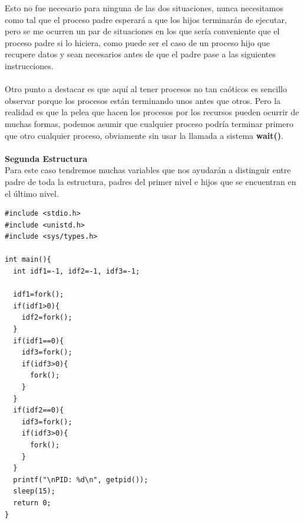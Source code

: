 \documentclass[11pt]{article}
\begin{document}
Esto no fue necesario para ninguna de las dos situaciones, nunca necesitamos como tal que el proceso padre esperará a que los hijos terminarán de ejecutar, pero se me ocurren un par de situaciones en los que sería conveniente que el proceso padre si lo hiciera, como puede ser el caso de un proceso hijo que recupere datos y sean necesarios antes de que el padre pase a las siguientes instrucciones.
\\\\
Otro punto a destacar es que aquí al tener procesos no tan caóticos es sencillo observar porque los procesos están terminando unos antes que otros. Pero la realidad es que la pelea que hacen los procesos por los recursos pueden ocurrir de muchas formas, podemos asumir que cualquier proceso podría terminar primero que otro cualquier proceso, obviamente sin usar la llamada a sistema \textbf{wait()}.
\\\\
\textbf{Segunda Estructura} 
\\
Para este caso tendremos muchas variables que nos ayudarán a distinguir entre padre de toda la estructura, padres del primer nivel e hijos que se encuentran en el último nivel. 

\begin{lstlisting}
#include <stdio.h>
#include <unistd.h>
#include <sys/types.h>

int main(){
  int idf1=-1, idf2=-1, idf3=-1;

  idf1=fork();
  if(idf1>0){
    idf2=fork();
  }
  if(idf1==0){
    idf3=fork();
    if(idf3>0){
      fork();
    }
  }
  if(idf2==0){
    idf3=fork();
    if(idf3>0){
      fork();
    }
  }
  printf("\nPID: %d\n", getpid());
  sleep(15);
  return 0;
}
\end{lstlisting}
\end{document}
